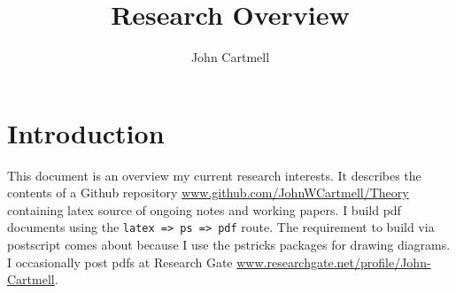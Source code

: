 \documentclass[10pt,a4paper]{article}
\theoremstyle{remark}
\begin{document}
\title{Research Overview}

\author{John Cartmell}

\maketitle


\section{Introduction}


\note This document is an overview my current research interests. It describes the contents of  a Github repository \url{www.github.com/JohnWCartmell/Theory} containing latex source of ongoing notes and working papers. I  build pdf documents using the \verb!latex => ps => pdf! route. The requirement to build via postscript comes about because I use the pstricks packages for drawing diagrams.
\note I occasionally post pdfs at Research Gate \url{www.researchgate.net/profile/John-Cartmell}.
\end{document}
